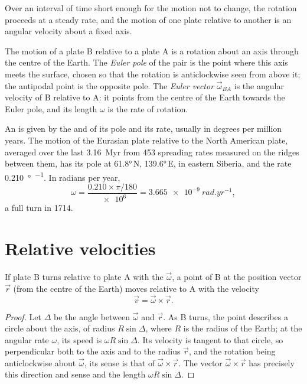 Over an interval of time short enough for the motion not to change, the
rotation proceeds at a steady rate, and the motion of one plate relative to
another is an angular velocity about a fixed axis.

\begin{definition}\label{def:b1:plate-kinematics:euler-pole}
The motion of a plate B relative to a plate A is a rotation about an axis
through the centre of the Earth. The \emph{Euler pole} of the
pair is the point where this axis meets the surface, chosen so that the
rotation is anticlockwise seen from above it; the antipodal point is the
opposite pole. The \emph{Euler vector}
$\vec\omega_{BA}$ is the angular velocity of B relative to A: it points from
the centre of the Earth towards the Euler pole, and its length $\omega$ is the
rate of rotation.
\end{definition}

An  is given by the  and  of its pole and its
rate, usually in degrees per million years. The motion of the Eurasian plate
relative to the North American plate, averaged over the last \qty{3.16}{Myr}
from 453 spreading rates measured on the ridges between them, has its pole at
\ang{61.8}\,N, \ang{139.6}\,E, in eastern Siberia, and the rate
\qty{0.210}{\degree\per\Myr}. In radians per year,
\[
  \omega = \frac{0.210\times\pi/180}{\num{e6}} = \qty{3.665e-9}{rad.yr^{-1}},
\]
a full turn in \qty{1714}{\Myr}.

\section{Relative velocities}

\begin{theorem}\label{thm:b1:plate-kinematics:velocity}
If plate B turns relative to plate A with the  $\vec\omega$, a point
of B at the position vector $\vec r$ (from the centre of the Earth) moves
relative to A with the velocity
\[
  \vec v = \vec\omega\times\vec r .
\]
\end{theorem}

\begin{proof}
Let $\Delta$ be the angle between $\vec\omega$ and $\vec r$. As B turns, the
point describes a circle about the axis, of radius $R\sin\Delta$, where $R$ is
the radius of the Earth; at the angular rate $\omega$, its speed is
$\omega R\sin\Delta$. Its velocity is tangent to that circle, so perpendicular
both to the axis and to the radius $\vec r$, and the rotation being
anticlockwise about $\vec\omega$, its sense is that of $\vec\omega\times\vec r$.
The vector $\vec\omega\times\vec r$ has precisely this direction and sense and
the length $\omega R\sin\Delta$.
\end{proof}

